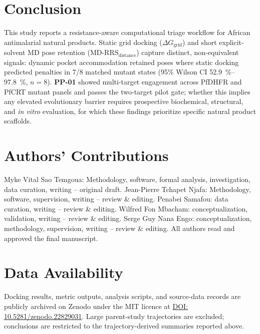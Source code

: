 \documentclass[journal=jcisd8,manuscript=article,layout=traditional]{achemso}
\begin{document}
\section{Conclusion}

This study reports a resistance-aware computational triage workflow for African antimalarial natural products. Static grid docking ($\Delta G_{\mathrm{grid}}$) and short explicit-solvent MD pose retention ($\mathrm{MD\text{-}RRS}_{\mathrm{distance}}$) capture distinct, non-equivalent signals: dynamic pocket accommodation retained poses where static docking predicted penalties in 7/8 matched mutant states (95\% Wilson CI \qtyrange{52.9}{97.8}{\percent}, $n=\num{8}$). \textbf{PP-01} showed multi-target engagement across PfDHFR and PfCRT mutant panels and passes the two-target pilot gate; whether this implies any elevated evolutionary barrier requires prospective biochemical, structural, and \textit{in vitro} evaluation, for which these findings prioritize specific natural product scaffolds.


\section*{Authors' Contributions}

Myke Vital Sao Temgoua: Methodology, software, formal analysis, investigation, data curation, writing -- original draft. Jean-Pierre Tchapet Njafa: Methodology, software, supervision, writing -- review \& editing. Penabei Samafou: data curation, writing -- review \& editing. Wilfred Fon Mbacham: conceptualization, validation, writing -- review \& editing. Serge Guy Nana Engo: conceptualization, methodology, supervision, writing -- review \& editing. All authors read and approved the final manuscript.

\section*{Data Availability}

Docking results, metric outputs, analysis scripts, and source-data records are publicly archived on Zenodo under the MIT licence at \href{https://doi.org/10.5281/zenodo.22829031}{DOI: 10.5281/zenodo.22829031}. Large parent-study trajectories are excluded; conclusions are restricted to the trajectory-derived summaries reported above.
\end{document}
